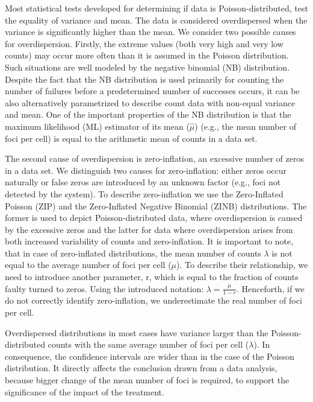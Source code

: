 Most statistical tests developed for determining if data is 
Poisson-distributed, test the equality of variance and mean. The data is 
considered overdispersed when the variance is significantly higher than the 
mean. We consider two possible causes for overdispersion. Firstly, the extreme 
values (both very high and very low counts) may occur more often than it is 
assumed in the Poisson distribution. Such situations are well modeled by the 
negative binomial (NB) distribution. Despite the fact that the NB distribution 
is used primarily for counting the number of failures before a predetermined 
number of successes occurs, it can be also alternatively parametrized to 
describe count data with non-equal variance and mean. One of the important 
properties of the NB distribution is that the maximum likelihood (ML) estimator 
of its mean ($\hat{\mu}$) (e.g., the mean number of foci per cell) is equal to 
the arithmetic mean of counts in a data set.

The second cause of overdispersion is zero-inflation, an excessive number of 
zeros in a data set. We distinguish two causes for zero-inflation: either zeros 
occur naturally or false zeros are introduced by an unknown factor (e.g., foci 
not detected by the system). To describe zero-inflation we use the Zero-Inflated 
Poisson (ZIP) and the Zero-Inflated Negative Binomial (ZINB) distributions. The 
former is used to depict Poisson-distributed data, where overdispersion is 
caused by the excessive zeros and the latter for data where overdispersion 
arises from both increased variability of counts and zero-inflation. It is 
important to note, that in case of zero-inflated distributions, the mean number 
of counts $\lambda$ is not equal to the average number of foci per cell ($\mu$). 
To describe their relationship, we need to introduce another parameter, r, which 
is equal to the fraction of counts faulty turned to zeros. Using the introduced 
notation: $\lambda = \frac{\mu}{1 - r}$. Henceforth, if we do not correctly 
identify zero-inflation, we underestimate the real number of foci per cell.

Overdispersed distributions in most cases have variance larger than the 
Poisson-distributed counts with the same average number of foci per cell 
($\lambda$). In consequence, the confidence intervals are wider than in the case of 
the Poisson distribution. It directly affects the conclusion drawn from a data 
analysis, because bigger change of the mean number of foci is required, to 
support the significance of the impact of the treatment. 

